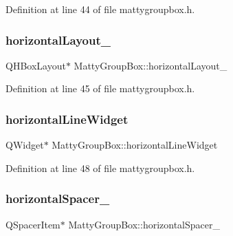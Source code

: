 Definition at line 44 of file mattygroupbox.\+h.

\hypertarget{classMattyGroupBox_a053f7794bcd10214414d41e9c09663e0}{}\label{classMattyGroupBox_a053f7794bcd10214414d41e9c09663e0} 
\subsubsection{\texorpdfstring{horizontal\+Layout\+\_}{horizontalLayout\_2}}
{\footnotesize\ttfamily Q\+H\+Box\+Layout$\ast$ Matty\+Group\+Box\+::horizontal\+Layout\+\_\hspace{0.3cm}{\ttfamily [private]}}



Definition at line 45 of file mattygroupbox.\+h.

\hypertarget{classMattyGroupBox_a34f61735914e5235c4bf58841e647f06}{}\label{classMattyGroupBox_a34f61735914e5235c4bf58841e647f06} 
\subsubsection{\texorpdfstring{horizontal\+Line\+Widget}{horizontalLineWidget}}
{\footnotesize\ttfamily Q\+Widget$\ast$ Matty\+Group\+Box\+::horizontal\+Line\+Widget\hspace{0.3cm}{\ttfamily [private]}}



Definition at line 48 of file mattygroupbox.\+h.

\hypertarget{classMattyGroupBox_a6b2678b09a3c56c18f357775e83b76c0}{}\label{classMattyGroupBox_a6b2678b09a3c56c18f357775e83b76c0} 
\subsubsection{\texorpdfstring{horizontal\+Spacer\+\_}{horizontalSpacer\_1}}
{\footnotesize\ttfamily Q\+Spacer\+Item$\ast$ Matty\+Group\+Box\+::horizontal\+Spacer\+\_\hspace{0.3cm}{\ttfamily [private]}}



